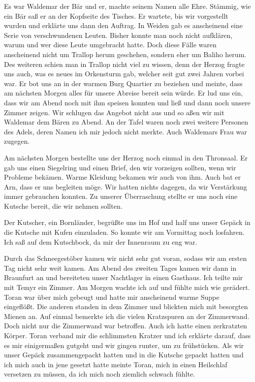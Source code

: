 Es war Waldemar der Bär und er, machte seinem Namen alle Ehre. Stämmig, wie ein Bär saß er an der Kopfseite des Tisches. Er wartete, bis wir vorgestellt wurden und erklärte uns dann den Auftrag. In Weiden gab es anscheinend eine Serie von verschwundenen Leuten. Bisher konnte man noch nicht aufklären, warum und wer diese Leute umgebracht hatte. Doch diese Fälle waren anscheinend nicht um Trallop herum geschehen, sondern eher um Baliho herum. Des weiteren schien man in Trallop nicht viel zu wissen, denn der Herzog fragte uns auch, was es neues im Orkensturm gab, welcher seit gut zwei Jahren vorbei war. Er bot uns an in der warmen Burg Quartier zu beziehen und meinte, dass am nächsten Morgen alles für unsere Abreise bereit sein würde. Er lud uns ein, dass wir am Abend noch mit ihm speisen konnten und ließ und dann noch unsere Zimmer zeigen. Wir schlugen das Angebot nicht aus und so aßen wir mit Waldemar dem Bären zu Abend. An der Tafel waren noch zwei weitere Personen des Adels, deren Namen ich mir jedoch nicht merkte. Auch Waldemars Frau war zugegen.

Am nächsten Morgen bestellte uns der Herzog noch einmal in den Thronsaal. Er gab uns einen Siegelring und einen Brief, den wir vorzeigen sollten, wenn wir Probleme bekämen. Warme Kleidung bekamen wir auch von ihm. Auch bat er Arn, dass er uns begleiten möge. Wir hatten nichts dagegen, da wir Verstärkung immer gebrauchen konnten. Zu unserer Überraschung stellte er uns noch eine Kutsche bereit, die wir nehmen sollten.

Der Kutscher, ein Bornländer, begrüßte uns im Hof und half uns unser Gepäck in die Kutsche mit Kufen einzuladen. So konnte wir am Vormittag noch losfahren. Ich saß auf dem Kutschbock, da mir der Innenraum zu eng war.

Durch das Schneegestöber kamen wir nicht sehr gut voran, sodass wir am ersten Tag nicht sehr weit kamen. Am Abend des zweiten Tages kamen wir dann in Braunfurt an und bereiteten unser Nachtlager in einen Gasthaus. Ich teilte mir mit Temyr ein Zimmer. Am Morgen wachte ich auf und fühlte mich wie gerädert. Toran war über mich gebeugt und hatte mir anscheinend warme Suppe eingeflößt. Die anderen standen in dem Zimmer und blickten mich mit besorgten Mienen an. Auf einmal bemerkte ich die vielen Kratzspuren an der Zimmerwand. Doch nicht nur die Zimmerwand war betroffen. Auch ich hatte einen zerkratzten Körper. Toran verband mir die schlimmsten Kratzer und ich erklärte darauf, dass es mir einigermaßen gutgeht und wir gingen runter, um zu frühstücken. Als wir unser Gepäck zusammengepackt hatten und in die Kutsche gepackt hatten und ich mich auch in jene gesetzt hatte meinte Toran, mich in einen Heilschlaf versetzen zu müssen, da ich mich noch ziemlich schwach fühlte.

